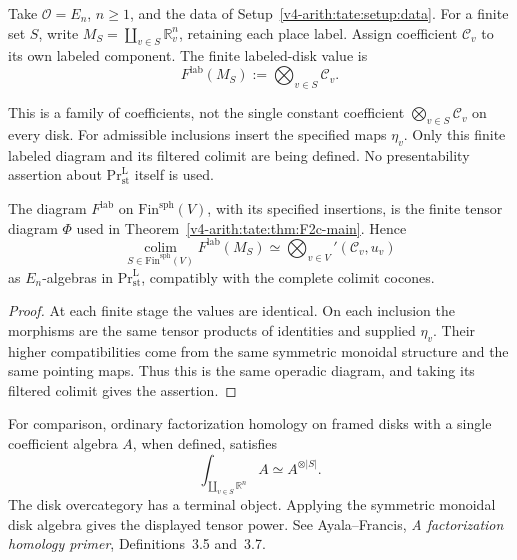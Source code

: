 \begin{setup}
\label{v4-arith:tate:setup:factorization-homology}
Take \(\mathcal O=E_n\), \(n\geq1\), and the data of
Setup~\ref{v4-arith:tate:setup:data}. For a finite set \(S\),
write \(M_S=\coprod_{v\in S}\mathbb R^n_v\), retaining each
place label. Assign coefficient \(\mathcal C_v\) to its own
labeled component. The finite labeled-disk value is
\[
 F^{\mathrm{lab}}(M_S):=\bigotimes_{v\in S}\mathcal C_v.
\]

This is a family of coefficients, not the single constant
coefficient \(\bigotimes_{v\in S}\mathcal C_v\) on every disk.
For admissible inclusions insert the specified maps \(\eta_v\).
Only this finite labeled diagram and its filtered colimit are
being defined. No presentability assertion about
\(\mathrm{Pr}^{\mathrm L}_{\mathrm{st}}\) itself is used.
\end{setup}

\begin{theorem}
\label{v4-arith:tate:thm:verification-via-factorization-homology}
The diagram \(F^{\mathrm{lab}}\) on
\(\mathrm{Fin}^{\mathrm{sph}}(V)\), with its specified
insertions, is the finite tensor diagram \(\Phi\) used in
Theorem~\ref{v4-arith:tate:thm:F2c-main}. Hence
\[
 \operatorname*{colim}_{S\in\mathrm{Fin}^{\mathrm{sph}}(V)}
       F^{\mathrm{lab}}(M_S)
 \simeq\bigotimes_{v\in V}'(\mathcal C_v,u_v)
\]
as \(E_n\)-algebras in
\(\mathrm{Pr}^{\mathrm L}_{\mathrm{st}}\), compatibly with the
complete colimit cocones.
\end{theorem}

\begin{proof}
At each finite stage the values are identical. On each inclusion
the morphisms are the same tensor products of identities and
supplied \(\eta_v\). Their higher compatibilities come from the
same symmetric monoidal structure and the same pointing maps.
Thus this is the same operadic diagram, and taking its filtered
colimit gives the assertion.
\end{proof}

For comparison, ordinary factorization homology on framed disks
with a single coefficient algebra \(A\), when defined, satisfies
\[
\int_{\coprod_{v\in S}\mathbb R^n}A\simeq A^{\otimes |S|}.
\]
The disk overcategory has a terminal object. Applying the
symmetric monoidal disk algebra gives the displayed tensor
power. See Ayala--Francis, \emph{A factorization homology primer},
Definitions~3.5 and~3.7.

